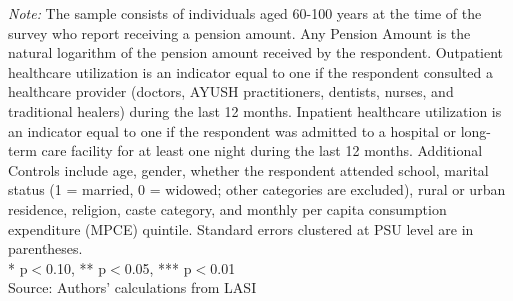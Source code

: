 \begin{table}[H]
\centering
\vspace{1.8mm}
\caption{Outpatient and Inpatient Healthcare Utilization and Pension Amount}
\label{tab:pension_amount_out_inp}
\vspace{3mm}
\vspace{2mm}
\begin{minipage}{0.95\textwidth}
\footnotesize \textit{Note:} The sample consists of individuals aged 60-100 years at the time of the survey who report receiving a pension amount. Any Pension Amount is the natural logarithm of the pension amount received by the respondent. Outpatient healthcare utilization is an indicator equal to one if the respondent consulted a healthcare provider (doctors, AYUSH practitioners, dentists, nurses, and traditional healers) during the last 12 months. Inpatient healthcare utilization is an indicator equal to one if the respondent was admitted to a hospital or long-term care facility for at least one night during the last 12 months. Additional Controls include age, gender, whether the respondent attended school, marital status (1 = married, 0 = widowed; other categories are excluded), rural or urban residence, religion, caste category, and monthly per capita consumption expenditure (MPCE) quintile. Standard errors clustered at PSU level are in parentheses. \\ * p$<$0.10, ** p$<$0.05, *** p$<$0.01\\
Source: Authors' calculations from LASI
\end{minipage}
\end{table}
